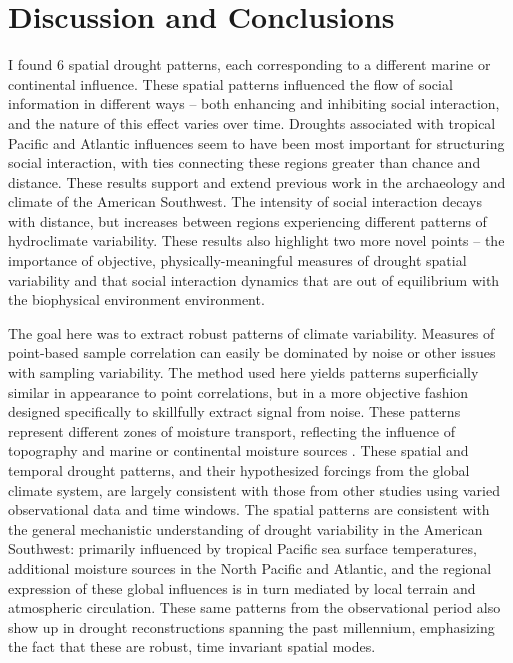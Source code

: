 \documentclass[10pt]{iopart}
\begin{document}
\section*{Discussion and Conclusions}
I found 6 spatial drought patterns, each corresponding to a different marine or continental influence. These spatial patterns influenced the flow of social information in different ways -- both enhancing and inhibiting social interaction, and the nature of this effect varies over time. Droughts associated with tropical Pacific and Atlantic influences seem to have been most important for structuring social interaction, with ties connecting these regions greater than chance and distance. These results support and extend previous work in the archaeology and climate of the American Southwest. The intensity of social interaction decays with distance, but increases between regions experiencing different patterns of hydroclimate variability. These results also highlight two more novel points -- the importance of objective, physically-meaningful measures of drought spatial variability and that social interaction dynamics that are out of equilibrium with the biophysical environment environment.

The goal here was to extract robust patterns of climate variability. Measures of point-based sample correlation can easily be dominated by noise or other issues with sampling variability. The method used here yields patterns superficially similar in appearance to point correlations, but in a more objective fashion designed specifically to skillfully extract signal from noise. These patterns represent different zones of moisture transport, reflecting the influence of topography and marine or continental moisture sources \parencite{Liu2010, Hu2011}. These spatial and temporal drought patterns, and their hypothesized forcings from the global climate system, are largely consistent with those from other studies using varied observational data and time windows\parencite{Comrie1999,Cook1999,McCabe1999,McCabe2004,Herrmann2016DivergentElevations,Ryu2010,Seager2014}. The spatial patterns are consistent with the general mechanistic understanding of drought variability in the American Southwest: primarily influenced by tropical Pacific sea surface temperatures, additional moisture sources in the North Pacific and Atlantic, and the regional expression of these global influences is in turn mediated by local terrain and atmospheric circulation. These same patterns from the observational period also show up in drought reconstructions spanning the past millennium, emphasizing the fact that these are robust, time invariant spatial modes.
\end{document}
